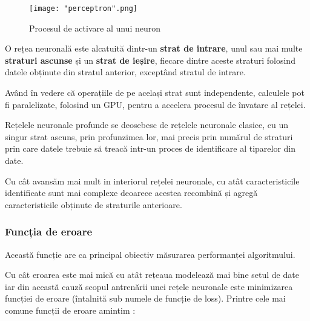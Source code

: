 \documentclass[a4paper, 12pt]{article}
\begin{document}
	\begin{figure}[h]
		\centering
		\texttt{[image: "perceptron".png]}
		\caption{Procesul de activare al unui neuron \textbf{\cite{zurada1992introduction}} }
		\label{fig:neuron}
	\end{figure} 
	
	O rețea neuronală este alcatuită dintr-un \textbf{strat de intrare}, unul sau mai multe \textbf{straturi ascunse} și un \textbf{strat de ieșire}, fiecare dintre aceste straturi folosind datele obținute din stratul anterior, exceptând stratul de intrare.
	
	Având în vedere că operațiile de pe același strat sunt independente, calculele pot fi paralelizate, folosind un GPU, pentru a accelera procesul de învatare al rețelei.
	
	Rețelele neuronale profunde se deosebesc de rețelele neuronale clasice, cu un singur strat ascuns, prin profunzimea lor, mai precis prin numărul de straturi prin care datele trebuie să treacă intr-un proces de identificare al tiparelor din date.
	
	Cu cât avansăm mai mult in interiorul rețelei neuronale, cu atât caracteristicile identificate sunt mai complexe deoarece acestea recombină și agregă caracteristicile obținute de straturile anterioare.
	
	\subsubsection{Funcția de eroare}
	\qquad Această funcție are ca principal obiectiv măsurarea performanței algoritmului.
	
	Cu cât eroarea este mai mică cu atât rețeaua modelează mai bine setul de date iar din această cauză scopul antrenării unei rețele neuronale este minimizarea funcției de eroare (întalnită sub numele de funcție de loss). Printre cele mai comune funcții de eroare amintim \textbf{\cite{parmar_parmar_2018}}: 
	
\end{document}
